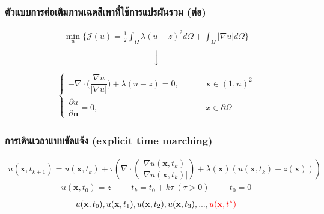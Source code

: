\documentclass[xcolor=dvipsnames, xetex,serif]{beamer}
\numberwithin{equation}{section}
\begin{document}
    \begin{frame}
        \frametitle{ตัวแบบการต่อเติมภาพเฉดสีเทาที่ใช้การแปรผันรวม (ต่อ)}
        \begin{align*}
        \min_{u} \{ \mathcal{J}(u) = \frac{1}{2} \int_{\Omega}\lambda (u-z)^2 d\Omega +  \int_{\Omega}  |\nabla u|  d\Omega \}
        \end{align*}
        $$ \Big \downarrow$$
        \begin{align*}
        \left \{ \begin{array}{ll}  - \nabla \cdot  \Big( \dfrac{\nabla u}{|\nabla u|} \Big) + \lambda (u-z) = 0,  & \hspace{1cm} \mathbf{x} \in (1,n)^2 \\ \dfrac{\partial u}{\partial \boldsymbol{n}} = 0, & \hspace{1cm} x \in \partial \Omega \end{array} \right .
        \end{align*}			
    \end{frame} 
    \begin{frame}
        \frametitle{การเดินเวลาแบบชัดแจ้ง (explicit time marching)}
        \begin{align*}
        u(\mathbf{x},t_{k+1})=u(\mathbf{x},t_{k})+\tau\left(\nabla \cdot\left(\dfrac{\nabla u (\mathbf{x},t_k)}{| \nabla u (\mathbf{x},t_k) | }\right) + \lambda(\mathbf{x})(u (\mathbf{x},t_k)-z(\mathbf{x})) \right)
        \end{align*}
        \begin{align*}
        u(\mathbf{x},t_0)=z \hspace{1cm} t_k=t_0+k\tau\ (\tau>0)  \hspace{1cm}  t_0=0
        \end{align*}
        \vspace{1cm}
        \begin{align*}
            u(\mathbf{x},t_0), u(\mathbf{x},t_1), u(\mathbf{x},t_2), u(\mathbf{x},t_3), ... ,  \textcolor{red}{u(\mathbf{x},t^{*})}
        \end{align*}
        \let\thefootnote\relax{}			
    \end{frame} 
\end{document}
